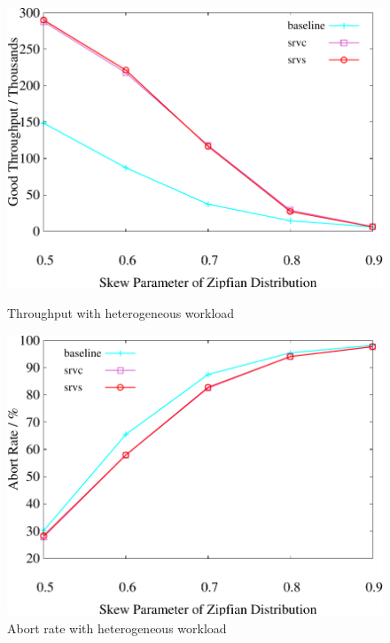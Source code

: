\begin{figure}[t]
    \centering
    \begin{minipage}[b]{0.32\linewidth}
        \centering
        \includegraphics[width=\textwidth]{./exp_fig/weighted_size/tps}
        \vspace{-2em}
        \caption{Throughput with heterogeneous workload}
        \label{fig:weighted:tps}
    \end{minipage}
    \begin{minipage}[b]{0.32\linewidth}
        \centering
        \includegraphics[width=\textwidth]{./exp_fig/weighted_size/abort}
        \vspace{-2em}
        \caption{Abort rate with heterogeneous workload}

\end{minipage}
\end{figure}

